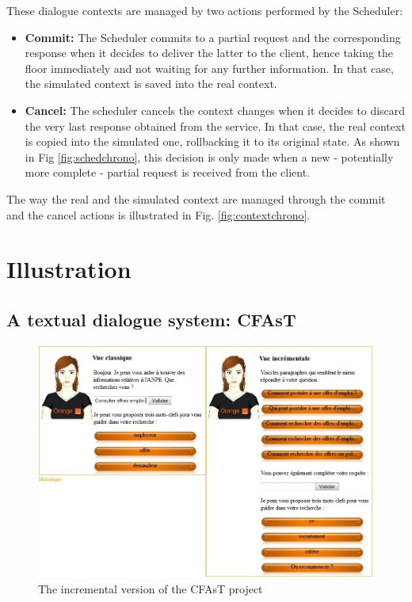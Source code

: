         These dialogue contexts are managed by two actions performed by the Scheduler:
        
        \begin{itemize}
        	\item \textbf{Commit:} The Scheduler commits to a partial request and the corresponding response when it decides to deliver the latter to the client, hence taking the floor immediately and not waiting for any further information. In that case, the simulated context is saved into the real context.
            \item \textbf{Cancel:} The scheduler cancels the context changes when it decides to discard the very last response obtained from the service. In that case, the real context is copied into the simulated one, rollbacking it to its original state. As shown in Fig \ref{fig:schedchrono}, this decision is only made when a new - potentially more complete - partial request is received from the client.
        \end{itemize}
 
 		The way the real and the simulated context are managed through the commit and the cancel actions is illustrated in Fig. \ref{fig:contextchrono}.

        
\section{Illustration}

	\subsection{A textual dialogue system: CFAsT}
    
    	\begin{figure}[ht]
          \centering
          \includegraphics[scale=0.6]{figures/CFAsTIncr.jpg}
          \caption{The incremental version of the CFAsT project}
          \label{fig:CFAsTIncr}
        \end{figure}
        
